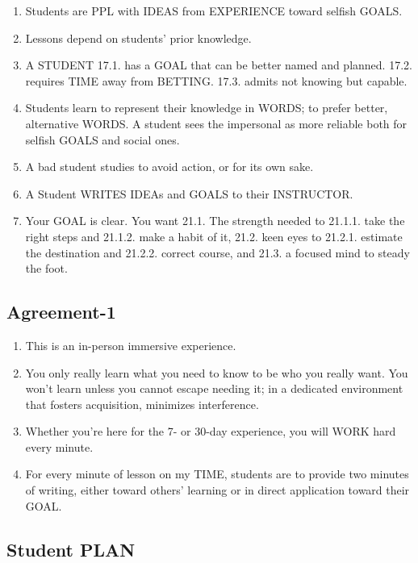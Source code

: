 \documentclass[
]{book}
\providecommand{\tightlist}{%
  \setlength{\itemsep}{0pt}\setlength{\parskip}{0pt}}
\begin{document}
\begin{enumerate}
\def\labelenumi{\arabic{enumi}.}
\setcounter{enumi}{14}
\tightlist
\item
  Students are PPL with IDEAS from EXPERIENCE toward selfish GOALS.
\item
  Lessons depend on students' prior knowledge.
\item
  A STUDENT
  17.1. has a GOAL that can be better named and planned.
  17.2. requires TIME away from BETTING.
  17.3. admits not knowing but capable.
\item
  Students learn to represent their knowledge in WORDS; to prefer better,
  alternative WORDS. A student sees the impersonal as more reliable both for
  selfish GOALS and social ones.
\item
  A bad student studies to avoid action, or for its own sake.
\item
  A Student WRITES IDEAs and GOALS to their INSTRUCTOR.
\item
  Your GOAL is clear. You want
  21.1. The strength needed to
  21.1.1. take the right steps and
  21.1.2. make a habit of it,
  21.2. keen eyes to
  21.2.1. estimate the destination and
  21.2.2. correct course, and
  21.3. a focused mind to steady the foot.
\end{enumerate}

\hypertarget{agreement-1}{%
\subsection{Agreement-1}\label{agreement-1}}

\begin{enumerate}
\def\labelenumi{\arabic{enumi}.}
\setcounter{enumi}{21}
\tightlist
\item
  This is an in-person immersive experience.
\item
  You only really learn what you need to know to be who you really want. You
  won't learn unless you cannot escape needing it; in a dedicated environment
  that fosters acquisition, minimizes interference.
\item
  Whether you're here for the 7- or 30-day experience, you will WORK hard every
  minute.
\item
  For every minute of lesson on my TIME, students are to provide two minutes of
  writing, either toward others' learning or in direct application toward their GOAL.
\end{enumerate}

\hypertarget{student-plan}{%
\subsection{Student PLAN}\label{student-plan}}
\end{document}
